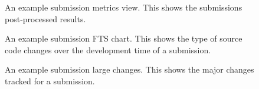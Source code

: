\begin{figure}[H]
  \centering
  \caption[Web Submission Data]{An example submission metrics view. This shows the submissions post-processed results.}
  \label{fig:web-submission-data}
\end{figure}

\begin{figure}[H]
  \centering
  \caption[Web Submission FTS Chart]{An example submission FTS chart. This shows the type of source code changes over the development time of a submission.}
  \label{fig:web-submission-fts-chart}
\end{figure}

\begin{figure}[H]
  \centering
  \caption[Web Submission Changes]{An example submission large changes. This shows the major changes tracked for a submission.}
  \label{fig:web-submission-changes}
\end{figure}

